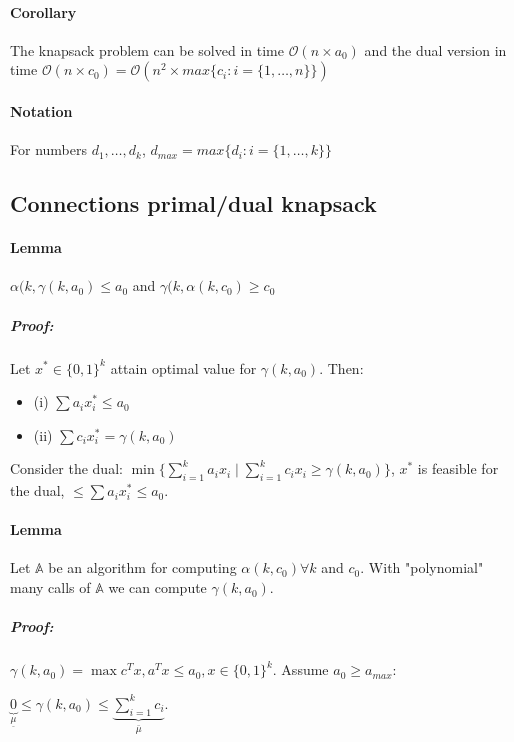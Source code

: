 \documentclass[main]{subfiles}
\begin{document}
\paragraph{Corollary} The knapsack problem can be solved in time
$\mathcal{O}(n \times a_{0})$ and the dual version in time
$\mathcal{O}(n \times c_{0}) = \mathcal{O}(n^{2} \times max\{c_{i}: i =
\{1, \dots, n\}\})$

\paragraph{Notation} For numbers $d_{1}, \dots, d_{k}$, $d_{max} = max\{d_{i}:
i =\{1, \dots, k\} \}$

\subsection{Connections primal/dual knapsack}

\paragraph{Lemma} $\alpha(k, \gamma(k, a_{0}) \leq a_{0}$ and $\gamma(k,
\alpha(k, c_{0}) \geq c_{0}$

\subparagraph{Proof:}
Let $x^{*} \in \{0,1\}^{k}$ attain optimal value for $\gamma(k, a_{0})$.
Then:
\begin{itemize}
\item (i) $\sum a_{i}x_{i}^{*} \leq a_{0}$
\item (ii) $\sum c_{i}x_{i}^{*} = \gamma(k, a_{0})$
\end{itemize}

Consider the dual: $\min \{\sum_{i=1}^{k} a_i x_{i} \mid \sum_{i=1}^{k}
c_{i} x_{i} \geq \gamma(k, a_{0})\}$, $x^{*}$ is feasible for the dual,
$\leq \sum a_{i}x_{i}^{*} \leq a_{0}$.

\paragraph{Lemma} Let $\mathbb{A}$ be an algorithm for computing
$\alpha(k, c_{0}) \forall k$ and $c_{0}$. With "polynomial" many calls of
$\mathbb{A}$ we can compute $\gamma(k, a_{0})$.

\subparagraph{Proof:}
$\gamma(k, a_{0}) = \max c^{T}x, a^{T}x \leq a_{0}, x \in \{0,1\}^{k}$.
Assume $a_{0} \geq a_{max}$:

$\underbrace{0}_{\underline{\mu}} \leq \gamma(k, a_{0}) \leq
\underbrace{\sum_{i=1}^{k}c_{i}}_{\bar{\mu}}$.
\end{document}
